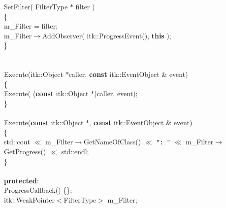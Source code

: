\begin{flushleft}
\hspace*{2\indentation}{\bf void} SetFilter( FilterType $\ast$ filter )\mbox{}\\
\hspace*{4\indentation}\{\mbox{}\\
\hspace*{4\indentation}m\_Filter = filter;\mbox{}\\
\hspace*{4\indentation}m\_Filter$\rightarrow$AddObserver( itk::ProgressEvent(), {\bf this} );\mbox{}\\
\hspace*{4\indentation}\}\mbox{}\\
\mbox{}\\
\mbox{}\\
\hspace*{2\indentation}{\bf void} Execute(itk::Object $\ast$caller, {\bf const} itk::EventObject \& event)\mbox{}\\
\hspace*{4\indentation}\{\mbox{}\\
\hspace*{4\indentation}Execute( ({\bf const} itk::Object $\ast$)caller, event);\mbox{}\\
\hspace*{4\indentation}\}\mbox{}\\
\hspace*{4\indentation}\mbox{}\\
\hspace*{2\indentation}{\bf void} Execute({\bf const} itk::Object $\ast$, {\bf const} itk::EventObject \& event)\mbox{}\\
\hspace*{4\indentation}\{\mbox{}\\
\hspace*{4\indentation}std::cout $\ll$ m\_Filter$\rightarrow$GetNameOfClass() $\ll$ {\tt": "} $\ll$ m\_Filter$\rightarrow$GetProgress() $\ll$ std::endl;\mbox{}\\
\hspace*{4\indentation}\}\mbox{}\\
\mbox{}\\
{\bf protected}:\mbox{}\\
\hspace*{2\indentation}ProgressCallback() \{\};\mbox{}\\
\hspace*{2\indentation}itk::WeakPointer$<$FilterType$>$   m\_Filter;\mbox{}\\

\end{flushleft}
